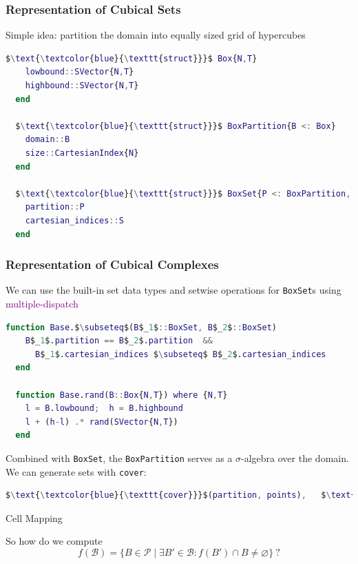 \documentclass[
  english,            %
  aspectratio=169,    %
]{tumbeamer}
\newcommand{\cB}{\mathcal{B}}
\newcommand{\cP}{\mathcal{P}}
\renewcommand{\emph}[1]{\textcolor{purple}{#1}}
\begin{document}
\begin{frame}[fragile]
\frametitle{Representation of Cubical Sets}

Simple idea: partition the domain into equally sized grid of hypercubes

\begin{lstlisting}[language=Matlab,mathescape]
  $\text{\textcolor{blue}{\texttt{struct}}}$ Box{N,T}
    lowbound::SVector{N,T}
    highbound::SVector{N,T}
  end

  $\text{\textcolor{blue}{\texttt{struct}}}$ BoxPartition{B <: Box}
    domain::B
    size::CartesianIndex{N}
  end

  $\text{\textcolor{blue}{\texttt{struct}}}$ BoxSet{P <: BoxPartition, S <: AbstractSet{<:CartesianIndex}}
    partition::P
    cartesian_indices::S
  end
\end{lstlisting}



\end{frame}

\begin{frame}[fragile]
\frametitle{Representation of Cubical Complexes}

We can use the built-in set data types and setwise operations for \texttt{BoxSet}s using \emph{multiple-dispatch}

\begin{lstlisting}[language=Matlab,mathescape]
  function Base.$\subseteq$(B$_1$::BoxSet, B$_2$::BoxSet)
    B$_1$.partition == B$_2$.partition  && 
      B$_1$.cartesian_indices $\subseteq$ B$_2$.cartesian_indices
  end

  function Base.rand(B::Box{N,T}) where {N,T}
    l = B.lowbound;  h = B.highbound
    l + (h-l) .* rand(SVector{N,T})
  end
\end{lstlisting}

Combined with \texttt{BoxSet}, the \texttt{BoxPartition} serves as a $\sigma$-algebra over the domain. We can generate sets with \texttt{cover}:

\begin{lstlisting}[language=Matlab,mathescape]
  $\text{\textcolor{blue}{\texttt{cover}}}$(partition, points),   $\text{\textcolor{blue}{\texttt{cover}}}$(partition, other_boxset)
\end{lstlisting}

\end{frame}

\begin{frame}{Cell Mapping}

So how do we compute 
\[
  f(\cB) = \{ B\in\cP \mid \exists B'\in\cB: f(B')\cap B \neq \varnothing\}\ ?
\]

\begin{figure}
  \label{fig:boximage}
\end{figure}

\end{frame}
\end{document}
